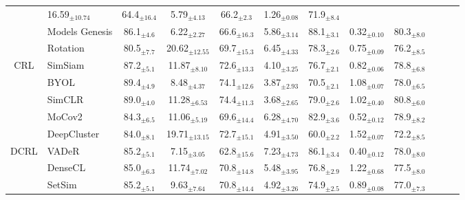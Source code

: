 \begin{table*}
\begin{tabular}{clcccccccccc}
&\cellcolor[gray]{0.9}16.59$_{\pm10.74}$
&64.4$_{\pm16.4}$
&5.79$_{\pm4.13}$
&66.2$_{\pm2.3}$
&1.26$_{\pm0.08}$
&71.9$_{\pm8.4}$
\\
&Models Genesis \cite{zhou2019models}
&\cellcolor[gray]{0.9}86.1$_{\pm4.6}$
&\cellcolor[gray]{0.9}6.22$_{\pm2.27}$
&66.6$_{\pm16.3}$
&5.86$_{\pm3.14}$
&88.1$_{\pm3.1}$
&0.32$_{\pm0.10}$
&80.3$_{\pm8.0}$
\\
&Rotation \cite{komodakis2018unsupervised}
&\cellcolor[gray]{0.9}80.5$_{\pm7.7}$
&\cellcolor[gray]{0.9}20.62$_{\pm12.55}$
&69.7$_{\pm15.3}$
&6.45$_{\pm4.33}$
&78.3$_{\pm2.6}$
&0.75$_{\pm0.09}$
&76.2$_{\pm8.5}$
\\
CRL
&SimSiam \cite{Chen2021CVPR}
&\cellcolor[gray]{0.9}87.2$_{\pm5.1}$
&\cellcolor[gray]{0.9}11.87$_{\pm8.10}$
&72.6$_{\pm13.3}$
&4.10$_{\pm3.25}$
&76.7$_{\pm2.1}$
&0.82$_{\pm0.06}$
&78.8$_{\pm6.8}$
\\
&BYOL \cite{grill2020bootstrap}
&\cellcolor[gray]{0.9}89.4$_{\pm4.9}$
&\cellcolor[gray]{0.9}8.48$_{\pm4.37}$
&74.1$_{\pm12.6}$
&3.87$_{\pm2.93}$
&70.5$_{\pm2.1}$
&1.08$_{\pm0.07}$
&78.0$_{\pm6.5}$
\\
&SimCLR \cite{chen2020simple}
&\cellcolor[gray]{0.9}89.0$_{\pm4.0}$
&\cellcolor[gray]{0.9}11.28$_{\pm6.53}$
&74.4$_{\pm11.3}$
&3.68$_{\pm2.65}$
&79.0$_{\pm2.6}$
&1.02$_{\pm0.40}$
&80.8$_{\pm6.0}$
\\
&MoCov2 \cite{chen2020improved}
&\cellcolor[gray]{0.9}84.3$_{\pm6.5}$
&\cellcolor[gray]{0.9}11.06$_{\pm5.19}$
&69.6$_{\pm14.4}$
&6.28$_{\pm4.70}$
&82.9$_{\pm3.6}$
&0.52$_{\pm0.12}$
&78.9$_{\pm8.2}$
\\
&DeepCluster \cite{caron2018deep}
&\cellcolor[gray]{0.9}84.0$_{\pm8.1}$
&\cellcolor[gray]{0.9}19.71$_{\pm13.15}$
&72.7$_{\pm15.1}$
&4.91$_{\pm3.50}$
&60.0$_{\pm2.2}$
&1.52$_{\pm0.07}$
&72.2$_{\pm8.5}$
\\
DCRL
&VADeR \cite{o2020unsupervised}
&\cellcolor[gray]{0.9}85.2$_{\pm5.1}$
&\cellcolor[gray]{0.9}7.15$_{\pm3.05}$
&62.8$_{\pm15.6}$
&7.23$_{\pm4.73}$
&86.1$_{\pm3.4}$
&0.40$_{\pm0.12}$
&78.0$_{\pm8.0}$
\\
&DenseCL \cite{wang2022densecl}
&\cellcolor[gray]{0.9}85.0$_{\pm6.3}$
&\cellcolor[gray]{0.9}11.74$_{\pm7.02}$
&70.8$_{\pm14.8}$
&5.48$_{\pm3.95}$
&76.8$_{\pm2.9}$
&1.22$_{\pm0.68}$
&77.5$_{\pm8.0}$
\\
&SetSim \cite{wang2022exploring}
&\cellcolor[gray]{0.9}85.2$_{\pm5.1}$
&\cellcolor[gray]{0.9}9.63$_{\pm7.64}$
&70.8$_{\pm14.4}$
&4.92$_{\pm3.26}$
&74.9$_{\pm2.5}$
&0.89$_{\pm0.08}$
&77.0$_{\pm7.3}$
\\

\end{tabular}
\end{table*}

